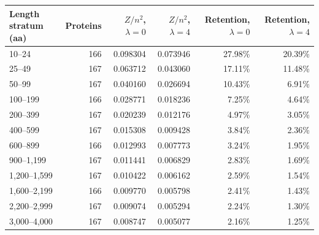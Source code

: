 \begin{tabular}{lrrrrr}
\toprule
Length stratum (aa) & Proteins & $Z/n^2$, $\lambda=0$ & $Z/n^2$, $\lambda=4$ & Retention, $\lambda=0$ & Retention, $\lambda=4$ \\
\midrule
10--24 & 166 & 0.098304 & 0.073946 & 27.98\% & 20.39\% \\
25--49 & 167 & 0.063712 & 0.043060 & 17.11\% & 11.48\% \\
50--99 & 167 & 0.040160 & 0.026694 & 10.43\% & 6.91\% \\
100--199 & 166 & 0.028771 & 0.018236 & 7.25\% & 4.64\% \\
200--399 & 167 & 0.020239 & 0.012176 & 4.97\% & 3.05\% \\
400--599 & 167 & 0.015308 & 0.009428 & 3.84\% & 2.36\% \\
600--899 & 166 & 0.012993 & 0.007773 & 3.24\% & 1.95\% \\
900--1,199 & 167 & 0.011441 & 0.006829 & 2.83\% & 1.69\% \\
1,200--1,599 & 167 & 0.010422 & 0.006162 & 2.59\% & 1.54\% \\
1,600--2,199 & 166 & 0.009770 & 0.005798 & 2.41\% & 1.43\% \\
2,200--2,999 & 167 & 0.009074 & 0.005294 & 2.24\% & 1.30\% \\
3,000--4,000 & 167 & 0.008747 & 0.005077 & 2.16\% & 1.25\% \\
\bottomrule
\end{tabular}
